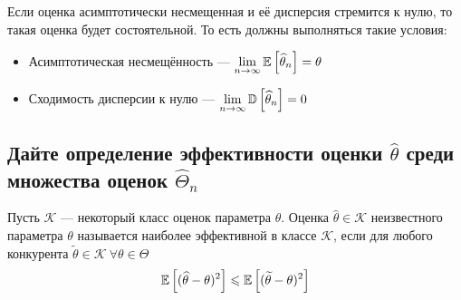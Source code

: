 \documentclass{article}
\begin{document}
\theorem Если оценка асимптотически несмещенная и её дисперсия стремится к нулю, то такая оценка будет состоятельной. То есть должны выполняться такие условия:
\begin{itemize}
    \item Асимптотическая несмещённость — $\lim\limits_{n\to\infty}\mathbb{E}\left[\widehat{\theta}_n\right]=\theta$
    \item Сходимость дисперсии к нулю — $\lim\limits_{n\to\infty}\mathbb{D}\left[\widehat{\theta}_n\right]=0$
\end{itemize}




\subsection{Дайте определение эффективности оценки $\widehat{\theta}$ среди множества оценок $\widehat{\Theta}_n$}
 Пусть $\mathcal{K}$ — некоторый класс оценок параметра $\theta$. Оценка $\widehat{\theta}\in\mathcal{K}$ неизвестного параметра $\theta$ называется наиболее эффективной в классе $\mathcal{K}$, если для любого конкурента $\widetilde{\theta}\in\mathcal{K}\ \forall \theta\in\Theta$
\begin{equation*}
    \begin{aligned}
        \mathbb{E}\left[(\widehat{\theta}-\theta)^2\right]\leqslant\mathbb{E}\left[(\widetilde{\theta}-\theta)^2\right]
    \end{aligned}
\end{equation*}


\end{document}
